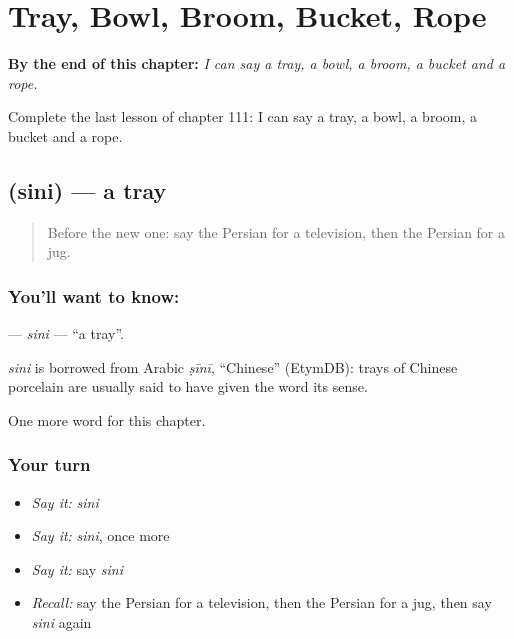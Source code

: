 
\chapter{Tray, Bowl, Broom, Bucket, Rope}
\label{ch:fa-tray-bowl-broom-bucket-rope}

\begin{chapteropening}
\textbf{By the end of this chapter:} \emph{I can say a tray, a bowl, a broom, a bucket and a rope.}

Complete the last lesson of chapter 111: I can say a tray, a bowl, a broom, a bucket and a rope.
\end{chapteropening}

\section[\texorpdfstring{\fa{سینی} (sini)}{سینی (sini)}]{ (sini) — a tray}

\label{lesson:FA-C111-sini}



\begin{quote}
Before the new one: say the Persian for a television, then the Persian for a jug.
\end{quote}

\subsection*{You'll want to know: }
\textbf{} — \emph{sini} — \textquotedblleft{}a tray\textquotedblright{}.

\begin{cousinweb}
\emph{sini} is borrowed from Arabic \emph{ṣīnī}, \textquotedblleft{}Chinese\textquotedblright{} (EtymDB): trays of Chinese porcelain are usually said to have given the word its sense.
\end{cousinweb}

\begin{grammarlens}[title={What you've built}]
One more word for this chapter.
\end{grammarlens}

\subsection*{Your turn}
\begin{itemize}
\raggedright
  \item \emph{Say it:} \emph{sini}
  \item \emph{Say it:} \emph{sini}, once more
  \item \emph{Say it:} say \emph{sini}
  \item \emph{Recall:} say the Persian for a television, then the Persian for a jug, then say \emph{sini} again
\end{itemize}

